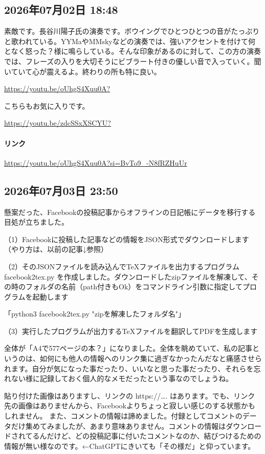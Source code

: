 \subsection*{2026年07月02日 18:48}

素敵です。長谷川陽子氏の演奏です。ボウイングでひとつひとつの音がたっぷりと歌われている。YYMaやMMskyなどの演奏では、強いアクセントを付けて何となく怒った？様に鳴らしている。そんな印象があるのに対して、この方の演奏では、フレーズの入りを大切そうにビブラート付きの優しい音で入っていく。聞いていて心が震えるよ。終わりの所も特に良い。

\url{https://youtu.be/oUhgS4Xuu0A?}

こちらもお気に入りです。

\url{https://youtu.be/zdcSSxXSCYU?}

\paragraph{リンク}
\url{https://youtu.be/oUhgS4Xuu0A?si=BvTo9_-N8fRZHuUr}

\subsection*{2026年07月03日 23:50}

懸案だった、Facebookの投稿記事からオフラインの日記帳にデータを移行する目処が立ちました。

（1）Facebookに投稿した記事などの情報をJSON形式でダウンロードします（やり方は、以前の記事↓参照）

（2）そのJSONファイルを読み込んでTeXファイルを出力するプログラム facebook2tex.py を作成しました。ダウンロードしたzipファイルを解凍して、その時のフォルダの名前（path付きもOk）をコマンドライン引数に指定してプログラムを起動します

「python3 facebook2tex.py  "zipを解凍したフォルダ名"」

（3）実行したプログラムが出力するTeXファイルを翻訳してPDFを生成します

全体が「A4で577ページの本？」になりました。全体を眺めていて、私の記事というのは、如何にも他人の情報へのリンク集に過ぎなかったんだなと痛感させられます。自分が気になった事だったり、いいなと思った事だったり、それらを忘れない様に記録しておく個人的なメモだったという事なのでしょうね。

貼り付けた画像はありますし、リンクの https://…. はあります。でも、リンク先の画像はありませんから、Facebookよりちょっと寂しい感じのする状態かもしれません。
また、コメントの情報は諦めました。付録としてコメントのデータだけ集めてみましたが、あまり意味ありません。コメントの情報はダウンロードされてるんだけど、どの投稿記事に付いたコメントなのか、結びつけるための情報が無い様なのです。←ChatGPTにきいても「その様だ」と仰っています。

